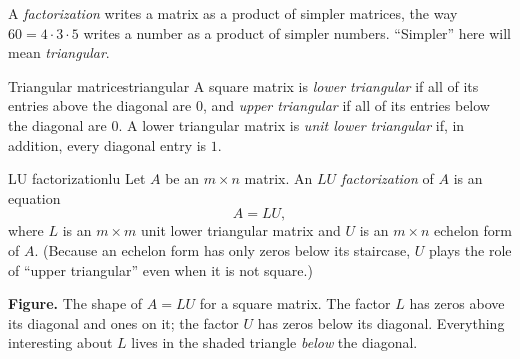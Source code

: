 \documentclass[11pt]{article}
\begin{document}
A \emph{factorization} writes a matrix as a product of simpler matrices, the way $60=4\cdot3\cdot5$ writes a number as a product of simpler numbers. ``Simpler'' here will mean \emph{triangular}.

\begin{defn}{Triangular matrices}{triangular}
A square matrix is \emph{lower triangular} if all of its entries above the diagonal are $0$, and \emph{upper triangular} if all of its entries below the diagonal are $0$. A lower triangular matrix is \emph{unit lower triangular} if, in addition, every diagonal entry is $1$.
\end{defn}

\begin{defn}{LU factorization}{lu}
Let $A$ be an $m\times n$ matrix. An \emph{$LU$ factorization} of $A$ is an equation
\[
A=LU,
\]
where $L$ is an $m\times m$ unit lower triangular matrix and $U$ is an $m\times n$ echelon form of $A$. (Because an echelon form has only zeros below its staircase, $U$ plays the role of ``upper triangular'' even when it is not square.)
\end{defn}

\begin{center}
\end{center}

\textbf{Figure.} The shape of $A=LU$ for a square matrix. The factor $L$ has zeros above its diagonal and ones on it; the factor $U$ has zeros below its diagonal. Everything interesting about $L$ lives in the shaded triangle \emph{below} the diagonal.
\end{document}
